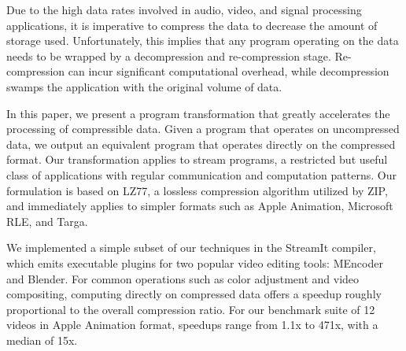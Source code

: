 Due to the high data rates involved in audio, video, and signal
processing applications, it is imperative to compress the data to
decrease the amount of storage used.  Unfortunately, this implies that
any program operating on the data needs to be wrapped by a
decompression and re-compression stage.  Re-compression can incur
significant computational overhead, while decompression swamps the
application with the original volume of data.

In this paper, we present a program transformation that greatly
accelerates the processing of compressible data.  Given a program that
operates on uncompressed data, we output an equivalent program that
operates directly on the compressed format.  Our transformation
applies to stream programs, a restricted but useful class of
applications with regular communication and computation patterns.  Our
formulation is based on LZ77, a lossless compression algorithm
utilized by ZIP, and immediately applies to simpler formats such as
Apple Animation, Microsoft RLE, and Targa.

We implemented a simple subset of our techniques in the StreamIt
compiler, which emits executable plugins for two popular video editing
tools: MEncoder and Blender.  For common operations such as color
adjustment and video compositing, computing directly on compressed
data offers a speedup roughly proportional to the overall compression
ratio.  For our benchmark suite of 12 videos in Apple Animation
format, speedups range from 1.1x to 471x, with a median of 15x.
